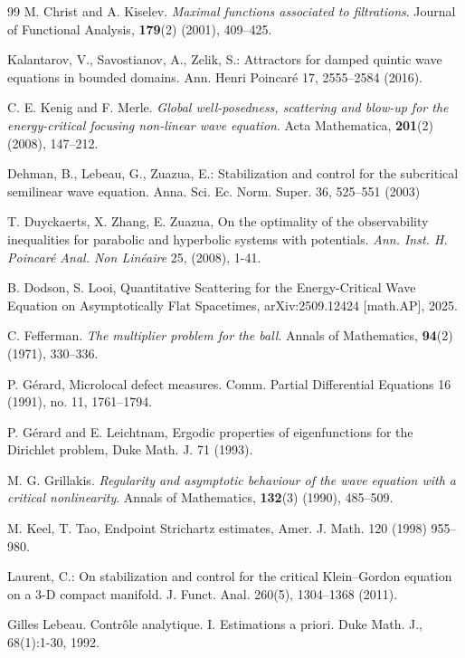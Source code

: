 \documentclass[11pt,letterpaper]{amsart}
\begin{document}
\begin{thebibliography}{99}
M. Christ and A. Kiselev.
\newblock \emph{Maximal functions associated to filtrations}.
\newblock Journal of Functional Analysis, \textbf{179}(2) (2001), 409--425.

 Kalantarov, V., Savostianov, A., Zelik, S.: Attractors for damped quintic wave equations in bounded
domains. Ann. Henri Poincaré 17, 2555–2584 (2016).

C. E. Kenig and F. Merle.
\newblock \emph{Global well-posedness, scattering and blow-up for the energy-critical focusing non-linear wave equation}.
\newblock Acta Mathematica, \textbf{201}(2) (2008), 147--212.


 Dehman, B., Lebeau, G., Zuazua, E.: Stabilization and control for the subcritical semilinear wave
equation. Anna. Sci. Ec. Norm. Super. 36, 525–551 (2003)

  T. Duyckaerts, X. Zhang, E. Zuazua, On the optimality of the observability inequalities for parabolic
and hyperbolic systems with potentials. {\em Ann. Inst. H. Poincar\'e Anal. Non Lin\'eaire} 25, (2008), 1-41.

 B. Dodson, S. Looi, Quantitative Scattering for the Energy-Critical Wave Equation on Asymptotically Flat Spacetimes, arXiv:2509.12424 [math.AP], 2025.

C. Fefferman.
\newblock \emph{The multiplier problem for the ball}.
\newblock Annals of Mathematics, \textbf{94}(2) (1971), 330--336.

  P. G\'erard,  Microlocal defect measures. Comm. Partial Differential Equations 16 (1991), no. 11, 1761--1794.

 P. G\'erard and E. Leichtnam,
Ergodic properties of eigenfunctions for the Dirichlet problem,
Duke Math. J. 71 (1993).

M. G. Grillakis.
\newblock \emph{Regularity and asymptotic behaviour of the wave equation with a critical nonlinearity}.
\newblock Annals of Mathematics, \textbf{132}(3) (1990), 485--509.

 M. Keel, T. Tao, Endpoint Strichartz estimates, Amer. J. Math. 120 (1998) 955–980.

 Laurent, C.: On stabilization and control for the critical Klein–Gordon equation on a 3-D compact
manifold. J. Funct. Anal. 260(5), 1304–1368 (2011).

Gilles Lebeau. Contr\^ole analytique. I. Estimations a priori. Duke Math.
J., 68(1):1-30, 1992.


\end{thebibliography}
\end{document}
